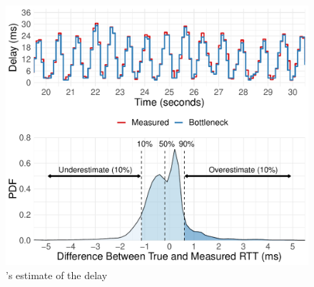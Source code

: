 \begin{figure}
    \centering
\begin{knitrout}
\color{fgcolor}
\includegraphics[width=\maxwidth]{figure/micro:time-delay-1} 

\end{knitrout}

    \caption{\name's estimate of the delay }
    \label{fig:micro:time-delay}
\end{figure}
